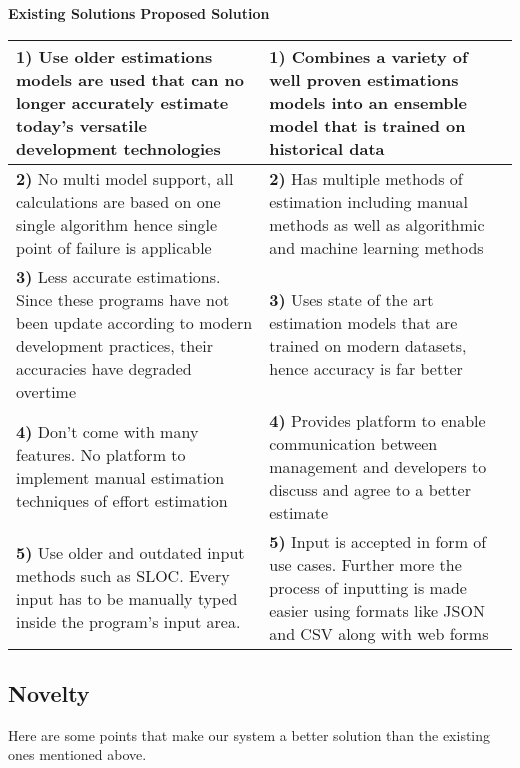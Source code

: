 \begin{center}

	\large{\textbf{Existing Solutions}} \hspace{30mm} \large{\textbf{Proposed Solution}}
	\vspace{5mm}
	\large

	\begin{tabularx}{\textwidth}{|X|X|}

		\hline
		{\textbf{1)} Use older estimations models are used that can no longer accurately estimate today's versatile development technologies} & {\textbf{1)} Combines a variety of well proven estimations models into an ensemble model that is trained on historical data} \\
		\hline
		{\textbf{2)} No multi model support, all calculations are based on one single algorithm hence single point of failure is applicable} & {\textbf{2)} Has multiple methods of estimation including manual methods as well as algorithmic and machine learning methods} \\
		\hline
		{\textbf{3)} Less accurate estimations. Since these programs have not been update according to modern development practices, their accuracies have degraded overtime} & {\textbf{3)} Uses state of the art estimation models that are trained on modern datasets, hence accuracy is far better} \\
		\hline
		{\textbf{4)} Don't come with many features. No platform to implement manual estimation techniques of effort estimation } & {\textbf{4)} Provides platform to enable communication between management and developers to discuss and agree to a better estimate} \\
		\hline
		{\textbf{5)} Use older and outdated input methods such as SLOC. Every input has to be manually typed inside the program's input area.} & {\textbf{5)} Input is accepted in form of use cases. Further more the process of inputting is made easier using formats like JSON and CSV along with web forms} \\
		\hline
		

	\end{tabularx}
\end{center}





\subsection{Novelty}
Here are some points that make our system a better solution than the existing ones mentioned above.

